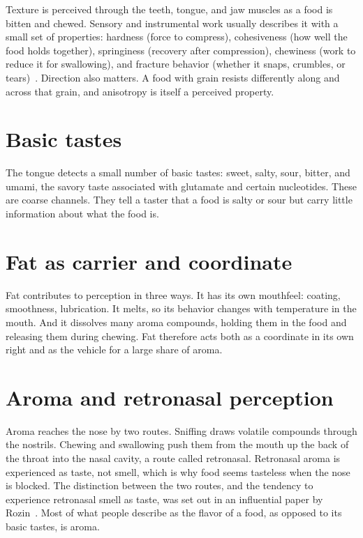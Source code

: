 \documentclass[11pt,openany]{book}
\theoremstyle{definition}
\begin{document}
Texture is perceived through the teeth, tongue, and jaw muscles as a food is bitten and chewed. Sensory and instrumental work usually describes it with a small set of properties: hardness (force to compress), cohesiveness (how well the food holds together), springiness (recovery after compression), chewiness (work to reduce it for swallowing), and fracture behavior (whether it snaps, crumbles, or tears)~\cite{bourne2002}. Direction also matters. A food with grain resists differently along and across that grain, and anisotropy is itself a perceived property.

\section{Basic tastes}

The tongue detects a small number of basic tastes: sweet, salty, sour, bitter, and umami, the savory taste associated with glutamate and certain nucleotides. These are coarse channels. They tell a taster that a food is salty or sour but carry little information about what the food is.

\section{Fat as carrier and coordinate}

Fat contributes to perception in three ways. It has its own mouthfeel: coating, smoothness, lubrication. It melts, so its behavior changes with temperature in the mouth. And it dissolves many aroma compounds, holding them in the food and releasing them during chewing. Fat therefore acts both as a coordinate in its own right and as the vehicle for a large share of aroma.

\section{Aroma and retronasal perception}

Aroma reaches the nose by two routes. Sniffing draws volatile compounds through the nostrils. Chewing and swallowing push them from the mouth up the back of the throat into the nasal cavity, a route called retronasal. Retronasal aroma is experienced as taste, not smell, which is why food seems tasteless when the nose is blocked. The distinction between the two routes, and the tendency to experience retronasal smell as taste, was set out in an influential paper by Rozin~\cite{rozin1982}. Most of what people describe as the flavor of a food, as opposed to its basic tastes, is aroma.
\end{document}
